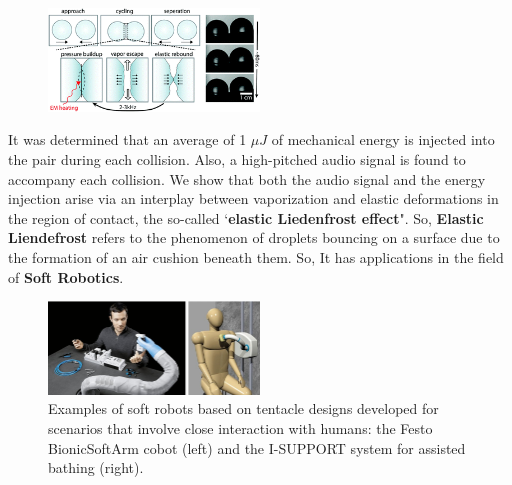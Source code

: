 \documentclass{article}
\begin{document}
\begin{figure}[h]
        \centering
        \includegraphics[width=0.5\textwidth ]{Image-4.png}
        \caption{\cite{4}}
        
     \label{fig:}
    \end{figure}

It was determined that an average of 1 $\mu J $ of mechanical energy is injected into the pair during each collision. Also, a high-pitched audio signal is found to accompany each collision. We show that both the audio signal and the energy injection arise via an interplay between vaporization and elastic deformations in the region of contact, the so-called ‘\textbf {elastic Liedenfrost effect}".
So, \textbf {Elastic Liendefrost} refers to the phenomenon of droplets bouncing on a surface due to the formation of an air cushion beneath them.
So, It has applications in the field of \textbf{Soft Robotics}.
\begin{figure}[h]
        \centering
        \includegraphics[width=0.5\textwidth ]{Soft Robots.png}
        \caption{\label{fig: Soft Robots}
        \footnotesize Examples of soft robots based on tentacle designs developed for scenarios that involve close interaction with humans: the Festo BionicSoftArm cobot (left) and the I-SUPPORT system for assisted bathing (right).\cite{2}}
    \end{figure}
\end{document}
